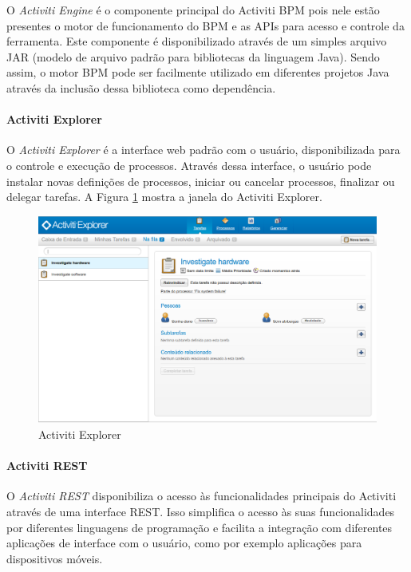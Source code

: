 O \textit{Activiti Engine} é o componente principal do Activiti BPM pois nele estão presentes o motor de funcionamento do BPM e as APIs para acesso e controle da ferramenta. Este componente é disponibilizado através de um simples arquivo JAR\cite{jar} (modelo de arquivo padrão para bibliotecas da linguagem Java). Sendo assim, o motor BPM pode ser facilmente utilizado em diferentes projetos Java através da inclusão dessa biblioteca como dependência.

\paragraph{Activiti Explorer}\label{sec:automatizacao_processos-gestao_processos_activiti_explorer}

O \textit{Activiti Explorer} é a interface web padrão com o usuário, disponibilizada para o controle e execução de processos. Através dessa interface, o usuário pode instalar novas definições de processos, iniciar ou cancelar processos, finalizar ou delegar tarefas. A Figura \ref{fig:activiti_explorer} mostra a janela do Activiti Explorer.

\begin{figure}[H]
\centering
\includegraphics[width=1\textwidth]{imagens/activiti_explorer.png}
\caption{Activiti Explorer}
\label{fig:activiti_explorer}
\end{figure}

\paragraph{Activiti REST}\label{sec:automatizacao_processos-gestao_processos_activiti_rest}

O \textit{Activiti REST} disponibiliza o acesso às funcionalidades principais do Activiti através de uma interface REST. Isso simplifica o acesso às suas funcionalidades por diferentes linguagens de programação e facilita a integração com diferentes aplicações de interface com o usuário, como por exemplo aplicações para dispositivos móveis.

